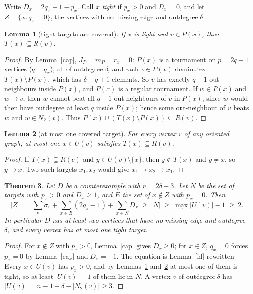 \documentclass[11pt]{article}
\newtheorem{theorem}{Theorem}
\newtheorem{lemma}[theorem]{Lemma}
\theoremstyle{definition}
\begin{document}
Write $D_x=2q_x-1-p_x$. Call $x$ \emph{tight} if $p_x>0$ and $D_x=0$, and let
$Z=\{x: q_x=0\}$, the vertices with no missing edge and outdegree $\delta$.

\begin{lemma}[tight targets are covered]\label{tight}
If $x$ is tight and $v\in P(x)$, then $T(x)\subseteq R(v)$.
\end{lemma}
\begin{proof}
By Lemma~\ref{cap}, $J_P=m_P=r_x=0$: $P(x)$ is a tournament on $p=2q-1$ vertices ($q=q_x$), all of outdegree $\delta$,
and each $v\in P(x)$ dominates $T(x)\setminus P(x)$, which has $\delta-q+1$ elements. So $v$ has exactly $q-1$
out-neighbours inside $P(x)$, and $P(x)$ is a regular tournament. If $w\in P(x)$ and $w\to v$, then $w$ cannot beat
all $q-1$ out-neighbours of $v$ in $P(x)$, since $w$ would then have outdegree at least $q$ inside $P(x)$; hence some
out-neighbour of $v$ beats $w$ and $w\in N_2(v)$. Thus $P(x)\cup(T(x)\setminus P(x))\subseteq R(v)$.
\end{proof}

\begin{lemma}[at most one covered target]\label{one}
For every vertex $v$ of any oriented graph, at most one $x\in U(v)$ satisfies $T(x)\subseteq R(v)$.
\end{lemma}
\begin{proof}
If $T(x)\subseteq R(v)$ and $y\in U(v)\setminus\{x\}$, then $y\notin T(x)$ and $y\neq x$, so $y\to x$. Two such
targets $x_1,x_2$ would give $x_1\to x_2\to x_1$.
\end{proof}

\begin{theorem}\label{main}
Let $D$ be a counterexample with $n=2\delta+3$. Let $N$ be the set of targets with $p_x>0$ and $D_x\ge 1$, and $E$ the
set of $x\notin Z$ with $p_x=0$. Then
\[ |Z| \;=\; \sum_v\sigma_v+\sum_{x\in E}(2q_x-1)+\sum_{x\in N}D_x \;\ge\; |N| \;\ge\; \max_v |U(v)|-1 \;\ge\; 2 .\]
In particular $D$ has at least two vertices that have no missing edge and outdegree $\delta$, and every vertex has at
most one tight target.
\end{theorem}
\begin{proof}
For $x\notin Z$ with $p_x>0$, Lemma~\ref{cap} gives $D_x\ge0$; for $x\in Z$, $q_x=0$ forces $p_x=0$ by
Lemma~\ref{cap} and $D_x=-1$. The equation is Lemma~\ref{id} rewritten. Every $x\in U(v)$ has $p_x>0$, and by
Lemmas~\ref{tight} and~\ref{one} at most one of them is tight, so at least $|U(v)|-1$ of them lie in $N$. A vertex $v$
of outdegree $\delta$ has $|U(v)|=n-1-\delta-|N_2(v)|\ge 3$.
\end{proof}
\end{document}
